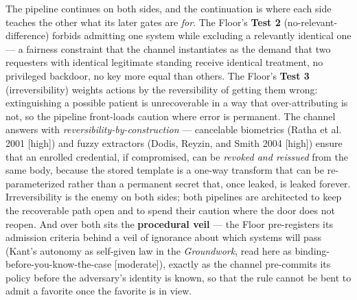 \documentclass[11pt]{article}
\begin{document}
The pipeline continues on both sides, and the continuation is where each side teaches the other what its later gates are \emph{for}. The Floor's \textbf{Test 2} (no-relevant-difference) forbids admitting one system while excluding a relevantly identical one — a fairness constraint that the channel instantiates as the demand that two requesters with identical legitimate standing receive identical treatment, no privileged backdoor, no key more equal than others. The Floor's \textbf{Test 3} (irreversibility) weights actions by the reversibility of getting them wrong: extinguishing a possible patient is unrecoverable in a way that over-attributing is not, so the pipeline front-loads caution where error is permanent. The channel answers with \emph{reversibility-by-construction} — cancelable biometrics (Ratha et al. 2001 [high]) and fuzzy extractors (Dodis, Reyzin, and Smith 2004 [high]) ensure that an enrolled credential, if compromised, can be \emph{revoked and reissued} from the same body, because the stored template is a one-way transform that can be re-parameterized rather than a permanent secret that, once leaked, is leaked forever. Irreversibility is the enemy on both sides; both pipelines are architected to keep the recoverable path open and to spend their caution where the door does not reopen. And over both sits the \textbf{procedural veil} — the Floor pre-registers its admission criteria behind a veil of ignorance about which systems will pass (Kant's autonomy as self-given law in the \emph{Groundwork}, read here as binding-before-you-know-the-case [moderate]), exactly as the channel pre-commits its policy before the adversary's identity is known, so that the rule cannot be bent to admit a favorite once the favorite is in view.
\end{document}
